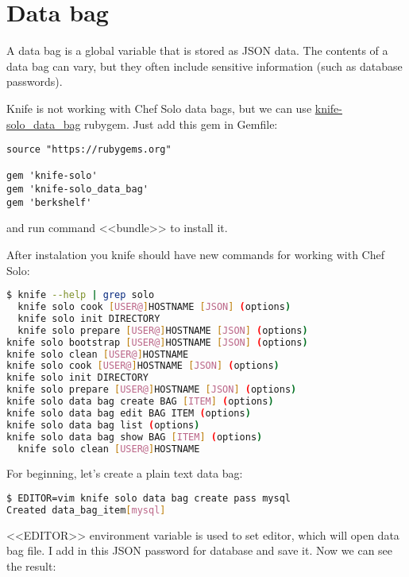 \section{Data bag}

A data bag is a global variable that is stored as JSON data. The contents of a data bag can vary, but they often include sensitive information (such as database passwords).

Knife is not working with Chef Solo data bags, but we can use \href{http://thbishop.com/knife-solo\_data\_bag/}{knife-solo\_data\_bag} rubygem. Just add this gem in Gemfile:

\begin{lstlisting}[label=lst:my-cloud-chef-databag1,title=my-cloud/Gemfile]
source "https://rubygems.org"

gem 'knife-solo'
gem 'knife-solo_data_bag'
gem 'berkshelf'
\end{lstlisting}

and run command <<bundle>> to install it.

After instalation you knife should have new commands for working with Chef Solo:

\begin{lstlisting}[language=Bash,label=lst:my-cloud-chef-databag2,title=my-cloud/Gemfile]
$ knife --help | grep solo
  knife solo cook [USER@]HOSTNAME [JSON] (options)
  knife solo init DIRECTORY
  knife solo prepare [USER@]HOSTNAME [JSON] (options)
knife solo bootstrap [USER@]HOSTNAME [JSON] (options)
knife solo clean [USER@]HOSTNAME
knife solo cook [USER@]HOSTNAME [JSON] (options)
knife solo init DIRECTORY
knife solo prepare [USER@]HOSTNAME [JSON] (options)
knife solo data bag create BAG [ITEM] (options)
knife solo data bag edit BAG ITEM (options)
knife solo data bag list (options)
knife solo data bag show BAG [ITEM] (options)
  knife solo clean [USER@]HOSTNAME
\end{lstlisting}

For beginning, let's create a plain text data bag:

\begin{lstlisting}[language=Bash,label=lst:my-cloud-chef-databag3,title=my-cloud/Gemfile]
$ EDITOR=vim knife solo data bag create pass mysql
Created data_bag_item[mysql]
\end{lstlisting}

<<EDITOR>> environment variable is used to set editor, which will open data bag file. I add in this JSON password for database and save it. Now we can see the result:


